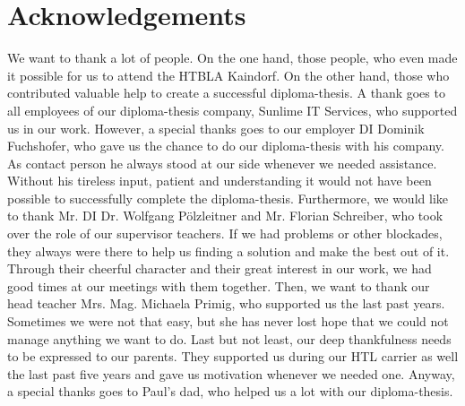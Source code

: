 \chapter*{Acknowledgements}
We want to thank a lot of people. On the one hand, those people, who even made it possible for us to attend the HTBLA Kaindorf. On the other hand, those who contributed valuable help to create a successful diploma-thesis.
\newline \newline
A thank goes to all employees of our diploma-thesis company, Sunlime IT Services, who supported us in our work. However, a special thanks goes to our employer DI Dominik Fuchshofer, who gave us the chance to do our diploma-thesis with his company. As contact person he always stood at our side whenever we needed assistance. Without his tireless input, patient and understanding it would not have been possible to successfully complete the diploma-thesis.
\newline \newline
Furthermore, we would like to thank Mr. DI Dr. Wolfgang Pölzleitner and Mr. Florian Schreiber, who took over the role of our supervisor teachers. If we had problems or other blockades, they always were there to help us finding a solution and make the best out of it. Through their cheerful character and their great interest in our work, we had good times at our meetings with them together.
\newline \newline
Then, we want to thank our head teacher Mrs. Mag. Michaela Primig, who supported us the last past years. Sometimes we were not that easy, but she has never lost hope that we could not manage anything we want to do.
\newline \newline
Last but not least, our deep thankfulness needs to be expressed to our parents. They supported us during our HTL carrier as well the last past five years and gave us motivation whenever we needed one. Anyway, a special thanks goes to Paul’s dad, who helped us a lot with our diploma-thesis.
